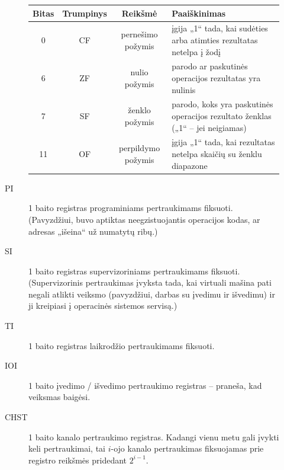 \begin{description}
\begin{description}
        \begin{tabularx}{0.85\textwidth}{|c|c|c|X|}
          \hline
          Bitas & Trumpinys & Reikšmė & Paaiškinimas %
          \\
          \hline
          0 & CF & pernešimo požymis & įgija „1“ tada, kai sudėties arba
          atimties rezultatas netelpa į žodį 
          \\
          \hline
          6 & ZF & nulio požymis & parodo ar paskutinės operacijos 
          rezultatas yra nulinis %
          \\
          \hline
          7 & SF & ženklo požymis & parodo, koks yra paskutinės operacijos 
          rezultato ženklas („1“ – jei neigiamas) 
          \\
          \hline
          11 & OF & perpildymo požymis & įgija „1“ tada, kai rezultatas
          netelpa skaičių su ženklu diapazone 
          \\
          \hline
        \end{tabularx}
      \item[PI] 1 baito registras programiniams pertraukimams fiksuoti.
        (Pavyzdžiui, buvo aptiktas neegzistuojantis operacijos kodas, ar
        adresas „išeina“ už numatytų ribų.)
      \item[SI] 1 baito registras supervizoriniams pertraukimams fiksuoti.
        (Supervizorinis pertraukimas įvyksta tada, kai virtuali mašina
        pati negali atlikti veiksmo (pavyzdžiui, darbas su įvedimu ir
        išvedimu) ir ji kreipiasi į operacinės sistemos servisą.)
      \item[TI] 1 baito registras laikrodžio pertraukimams fiksuoti.
      \item[IOI] 1 baito įvedimo / išvedimo pertraukimo registras – 
        praneša, kad veiksmas baigėsi. 
      \item[CHST] 1 baito kanalo pertraukimo registras. Kadangi vienu metu 
        gali įvykti keli pertraukimai, tai $i$-ojo kanalo pertraukimas
        fiksuojamas prie registro reikšmės pridedant $2^{i-1}$.
    \end{description}


\end{description}
